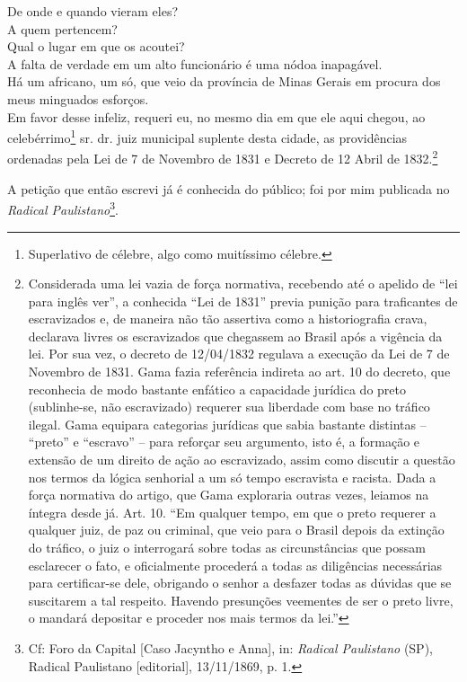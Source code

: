 De onde e quando vieram eles?\\
A quem pertencem?\\
Qual o lugar em que os acoutei?\\
A falta de verdade em um alto funcionário é uma nódoa inapagável.\\
Há um africano, um só, que veio da província de Minas Gerais em procura
dos meus minguados esforços.\\
Em favor desse infeliz, requeri eu, no mesmo dia em que ele aqui chegou,
ao celebérrimo\footnote{Superlativo de célebre, algo como muitíssimo
  célebre.} sr. dr. juiz municipal suplente desta cidade, as
providências ordenadas pela Lei de 7 de Novembro de 1831 e Decreto de 12
Abril de 1832.\footnote{Considerada uma lei vazia de força normativa,
  recebendo até o apelido de ``lei para inglês ver'', a conhecida ``Lei de
  1831'' previa punição para traficantes de escravizados e, de maneira
  não tão assertiva como a historiografia crava, declarava livres os
  escravizados que chegassem ao Brasil após a vigência da lei. Por sua
  vez, o decreto de 12/04/1832 regulava a execução da Lei de 7 de
  Novembro de 1831. Gama fazia referência indireta ao art. 10 do
  decreto, que reconhecia de modo bastante enfático a capacidade
  jurídica do preto (sublinhe-se, não escravizado) requerer sua
  liberdade com base no tráfico ilegal. Gama equipara categorias
  jurídicas que sabia bastante distintas -- ``preto'' e ``escravo'' -- para
  reforçar seu argumento, isto é, a formação e extensão de um direito de
  ação ao escravizado, assim como discutir a questão nos termos da
  lógica senhorial a um só tempo escravista e racista. Dada a força
  normativa do artigo, que Gama exploraria outras vezes, leiamos na
  íntegra desde já. Art. 10. ``Em qualquer tempo, em que o preto requerer
  a qualquer juiz, de paz ou criminal, que veio para o Brasil depois da
  extinção do tráfico, o juiz o interrogará sobre todas as
  circunstâncias que possam esclarecer o fato, e oficialmente procederá
  a todas as diligências necessárias para certificar-se dele, obrigando
  o senhor a desfazer todas as dúvidas que se suscitarem a tal respeito.
  Havendo presunções veementes de ser o preto livre, o mandará depositar
  e proceder nos mais termos da lei.''}

A petição que então escrevi já é conhecida do público; foi por mim
publicada no \emph{Radical Paulistano}\footnote{Cf: Foro da Capital
  {[}Caso Jacyntho e Anna{]}, in: \emph{Radical Paulistano} (SP),
  Radical Paulistano {[}editorial{]}, 13/11/1869, p. 1.}.

